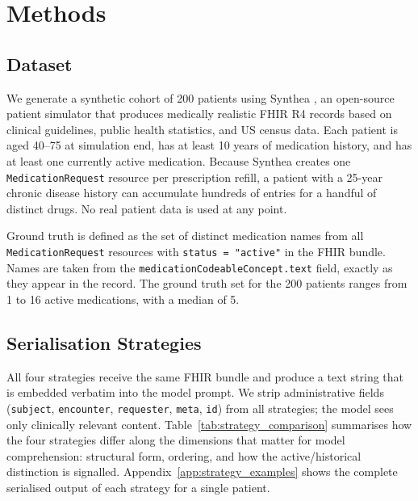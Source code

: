 \section{Methods}
\label{sec:methods}

\subsection{Dataset}

We generate a synthetic cohort of 200 patients using Synthea \cite{walonoski2018synthea},
an open-source patient simulator that produces medically realistic FHIR R4 records based
on clinical guidelines, public health statistics, and US census data. Each patient is
aged 40--75 at simulation end, has at least 10 years of medication history, and has at
least one currently active medication. Because Synthea creates one \texttt{MedicationRequest}
resource per prescription refill, a patient with a 25-year chronic disease history can
accumulate hundreds of entries for a handful of distinct drugs. No real patient data is
used at any point.

Ground truth is defined as the set of distinct medication names from all
\texttt{MedicationRequest} resources with \texttt{status = "active"} in the FHIR bundle.
Names are taken from the \texttt{medicationCodeableConcept.text} field, exactly as they
appear in the record. The ground truth set for the 200 patients ranges from 1 to 16 active
medications, with a median of 5.

\subsection{Serialisation Strategies}
\label{sec:strategies}

All four strategies receive the same FHIR bundle and produce a text string that is
embedded verbatim into the model prompt. We strip administrative fields
(\texttt{subject}, \texttt{encounter}, \texttt{requester}, \texttt{meta}, \texttt{id})
from all strategies; the model sees only clinically relevant content. Table~\ref{tab:strategy_comparison}
summarises how the four strategies differ along the dimensions that matter for model
comprehension: structural form, ordering, and how the active/historical distinction is
signalled. Appendix~\ref{app:strategy_examples} shows the complete serialised output of
each strategy for a single patient.

